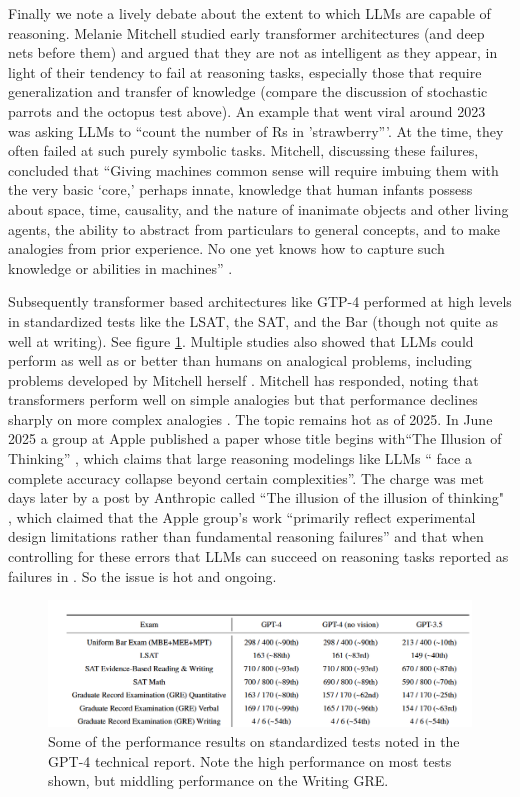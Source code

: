 Finally we note a lively debate about the extent to which LLMs are capable of reasoning. Melanie Mitchell studied early transformer architectures (and deep nets before them) and argued that they are not as intelligent as they appear, in light of their tendency to fail at reasoning tasks, especially those that require generalization and transfer of knowledge (compare the discussion of stochastic parrots and the octopus test above).  An example that went viral around 2023 was asking LLMs to  ``count the number of Rs in 'strawberry'''.  At the time, they often failed at such purely symbolic tasks.  Mitchell, discussing these failures, concluded that ``Giving machines common sense will require imbuing them with the very basic `core,' perhaps innate, knowledge that human infants possess about space, time, causality, and the nature of inanimate objects and other living agents, the ability to abstract from particulars to general concepts, and to make analogies from prior experience. No one yet knows how to capture such knowledge or abilities in machines'' \cite{mitchell2021ai}. 

Subsequently transformer based architectures like GTP-4 performed at high levels in standardized tests like the LSAT, the SAT, and the Bar (though not quite as well at writing). See figure \ref{llmStandardExams}. Multiple studies also showed that LLMs could perform as well as or better than humans on analogical problems, including problems developed by Mitchell herself \cite{webb2023emergent}.  Mitchell has responded, noting  that transformers perform well on simple analogies but that performance declines sharply on  more complex analogies \cite{lewis2025evaluating}. The topic remains hot as of 2025. In June 2025 a group at Apple published a paper whose title begins with``The Illusion of Thinking'' \cite{shojaee2025illusion}, which claims that large reasoning modelings like LLMs `` face a complete accuracy collapse beyond certain complexities''. The charge was met days later by a post by Anthropic called ``The illusion of the illusion of thinking" \cite{opus2025illusion}, which claimed that the Apple group's work ``primarily reflect experimental design limitations rather than fundamental reasoning failures'' and that when controlling for these errors that LLMs can succeed on reasoning tasks reported as failures in \cite{shojaee2025illusion}. So the issue is hot and ongoing.

\begin{figure}[h]
\centering
\includegraphics[scale=.8]{./images/llmStandardizedExams.png}
\caption[From \cite{achiam2023gpt}.]{Some of the performance results on standardized tests noted in the GPT-4 technical report.  Note the high performance on most tests shown, but middling performance on the Writing GRE. }
\label{llmStandardExams}
\end{figure}

